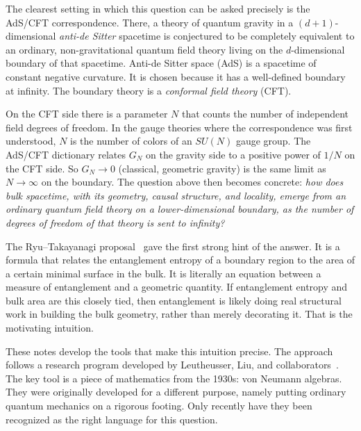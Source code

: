 The clearest setting in which this question can be asked precisely is the AdS/CFT correspondence. There, a
theory of quantum gravity in a $(d{+}1)$-dimensional \emph{anti-de Sitter} spacetime is conjectured to be
completely equivalent to an ordinary, non-gravitational quantum field theory living on the $d$-dimensional
boundary of that spacetime. Anti-de Sitter space (AdS) is a spacetime of constant negative curvature. It is
chosen because it has a well-defined boundary at infinity. The boundary theory is a \emph{conformal field
theory} (CFT).

On the CFT side there is a parameter $N$ that counts the number of independent field degrees of freedom. In
the gauge theories where the correspondence was first understood, $N$ is the number of colors of an $SU(N)$
gauge group. The AdS/CFT dictionary relates $G_N$ on the gravity side to a positive power of $1/N$ on the CFT
side. So $G_N\to0$ (classical, geometric gravity) is the same limit as $N\to\infty$ on the boundary. The
question above then becomes concrete: \emph{how does bulk spacetime, with its geometry, causal structure, and
locality, emerge from an ordinary quantum field theory on a lower-dimensional boundary, as the number of
degrees of freedom of that theory is sent to infinity?}

The Ryu--Takayanagi proposal~\cite{RT} gave the first strong hint of the answer. It is a formula that relates
the entanglement entropy of a boundary region to the area of a certain minimal surface in the bulk. It is
literally an equation between a measure of entanglement and a geometric quantity. If entanglement entropy and
bulk area are this closely tied, then entanglement is likely doing real structural work in building the bulk
geometry, rather than merely decorating it. That is the motivating intuition.

These notes develop the tools that make this intuition precise. The approach follows a research program
developed by Leutheusser, Liu, and collaborators~\cite{Liu2025}. The key tool is a piece of mathematics from
the 1930s: von Neumann algebras. They were originally developed for a different purpose, namely putting
ordinary quantum mechanics on a rigorous footing. Only recently have they been recognized as the right
language for this question.

